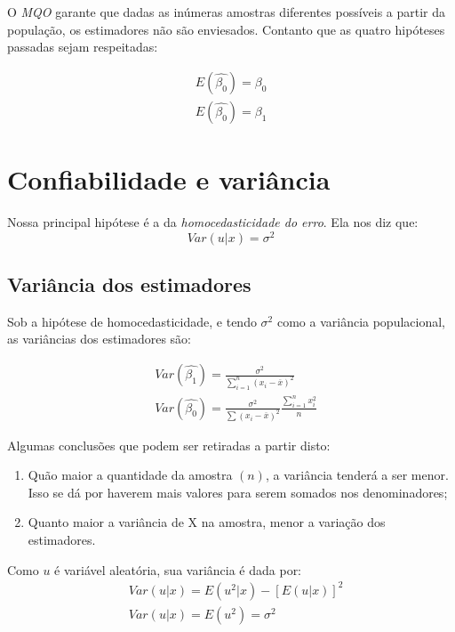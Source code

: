\documentclass[12pt,a4paper,oneside,brazil]{abntex2}
\begin{document}
O \emph{MQO} garante que dadas as inúmeras amostras diferentes possíveis a partir da população, os estimadores não são enviesados. Contanto que as quatro hipóteses passadas sejam respeitadas:

\begin{align}
    E(\hat{\beta_0}) = \beta_0 \\
    E(\hat{\beta_0}) = \beta_1
\end{align} 

\section{Confiabilidade e variância}

Nossa principal hipótese é a da \emph{homocedasticidade do erro}.
Ela nos diz que:
\begin{equation}
  \label{homocedasticidade}
Var(u|x) = \sigma^2
\end{equation}

\subsection{Variância dos estimadores}

Sob a hipótese de homocedasticidade, e tendo $\sigma^2$ como a variância populacional, as variâncias dos estimadores são:

\begin{align}
&Var(\hat{\beta_1}) = \frac{\sigma^2}{\sum \limits^{n}_{i = 1} (x_i - \overline{x})^2} \\
&Var(\hat{\beta_0}) = \frac{\sigma^2}{\sum \limits (x_i - \overline{x})^2} \frac{\sum \limits^{n}_{i = 1} x_i^2}{n}
\end{align}

Algumas conclusões que podem ser retiradas a partir disto:
\begin{enumerate}
  \item Quão maior a quantidade da amostra $(n)$, a variância tenderá a ser menor. Isso se dá por haverem mais valores para serem somados nos denominadores;
  \item Quanto maior a variância de X na amostra, menor a variação dos estimadores.
\end{enumerate}

Como $u$ é variável aleatória, sua variância é dada por:
\begin{align}
&  Var (u|x) = E(u^2|x) - [E(u|x)]^2 \\
&  Var (u|x) = E(u^2) = \sigma^2
\end{align}
\end{document}
